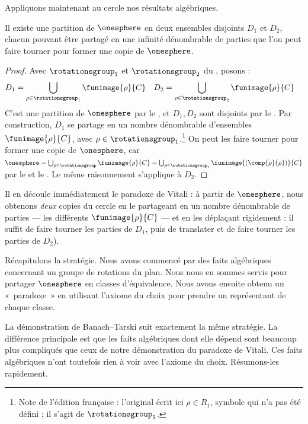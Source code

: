 \documentclass[../../../include/open-logic-section]{subfiles}
\begin{document}
Appliquons maintenant au cercle
nos résultats algébriques.

\begin{lem}
Il existe une partition de
$\onesphere$ en deux ensembles
disjoints $D_1$ et $D_2$,
chacun pouvant être partagé
en une infinité dénombrable
de parties que l'on peut
faire tourner pour former
une copie de $\onesphere$.
\end{lem}

\begin{proof}
Avec $\rotationsgroup_1$ et
$\rotationsgroup_2$ du
, posons :
\begin{align*}
	D_{1}
	&= \bigcup_{\rho \in \rotationsgroup_1}
	\funimage{\rho}{C} &
	D_{2}
	&= \bigcup_{\rho \in \rotationsgroup_2}
	\funimage{\rho}{C}
\end{align*}
C'est une partition de
$\onesphere$ par le ,
et $D_1,D_2$ sont disjoints
par le .
Par construction, $D_1$
se partage en un nombre
dénombrable d'ensembles
$\funimage{\rho}{C}$,
avec
$\rho\in\rotationsgroup_1$.\footnote{
Note de l'édition française :
l'original écrit ici $\rho\in R_1$,
symbole qui n'a pas été défini ;
il s'agit de $\rotationsgroup_1$.}
On peut les faire tourner pour
former une copie de $\onesphere$,
car
$\onesphere
=\bigcup_{\rho\in\rotationsgroup}
\funimage{\rho}{C}
=\bigcup_{\rho\in\rotationsgroup_1}
\funimage{(\comp{\rho}{\rho})}{C}$
par le 
et le .
Le même raisonnement s'applique
à $D_2$.
\end{proof}
\noindent
Il en découle immédiatement
le paradoxe de Vitali :
à partir de $\onesphere$,
nous obtenons \emph{deux}
copies du cercle en le partageant
en un nombre dénombrable de
parties — les différents
$\funimage{\rho}{C}$ —
et en les déplaçant rigidement :
il suffit de faire tourner
les parties de $D_1$, puis de
translater et de faire tourner
les parties de $D_2$).
%
%
%
%
%
%
%
%
%
%
%
%
%
%

Récapitulons la stratégie.
Nous avons commencé par des
faits algébriques concernant
un groupe de rotations du plan.
Nous nous en sommes servis
pour partager $\onesphere$
en classes d'équivalence.
Nous avons ensuite obtenu un
«~paradoxe~» en utilisant
l'axiome du choix pour prendre
un représentant de chaque classe.

La démonstration de
Banach--Tarski suit exactement
la même stratégie. La différence
principale est que les faits
algébriques dont elle dépend
sont beaucoup plus compliqués
que ceux de notre démonstration
du paradoxe de Vitali.
Ces faits algébriques n'ont
toutefois rien à voir avec
l'axiome du choix. Résumons-les
rapidement.
\end{document}
